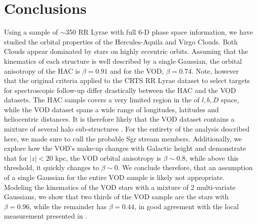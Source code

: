\documentclass[fleqn,usenatbib]{mnras}
\begin{document}
\section{Conclusions}
%
Using a sample of $\sim$350 RR Lyrae with full 6-D phase space
information, we have studied the orbital properties of the
Hercules-Aquila and Virgo Clouds. Both Clouds appear dominated by
stars on highly eccentric orbits. Assuming that the kinematics of each
structure is well described by a single Gaussian, the orbital
anisotropy of the HAC is $\beta=0.91$ and for the VOD,
$\beta=0.74$. Note, however that the original criteria applied to the
CRTS RR Lyrae dataset to select targets for spectroscopic follow-up
differ drastically between the HAC and the VOD datasets. The HAC
sample covers a very limited region in the of $l,b, D$ space, while
the VOD dataset spans a wide range of longitudes, latitudes and
heliocentric distances. It is therefore likely that the VOD dataset
contains a mixture of several halo sub-structures \citep[see][for a
  detailed discussion]{Vivas2016}. For the entirety of the analysis
described here, we made sure to cull the probable Sgr stream
members. Additionally, we explore how the VOD's make-up changes with
Galactic height and demonstrate that for $|z|<20$ kpc, the VOD orbital
anisotropy is $\beta\sim 0.8$, while above this threshold, it quickly
changes to $\beta\sim0$. We conclude therefore, that an assumption of
a single Gaussian for the entire VOD sample is likely not
appropriate. Modeling the kinematics of the VOD stars with a mixture
of 2 multi-variate Gaussians, we show that two thirds of the VOD
sample are the stars with $\beta=0.96$, while the remainder has
$\beta=0.44$, in good agreement with the local measurement presented
in \citet{Belokurov2018}.
\end{document}
